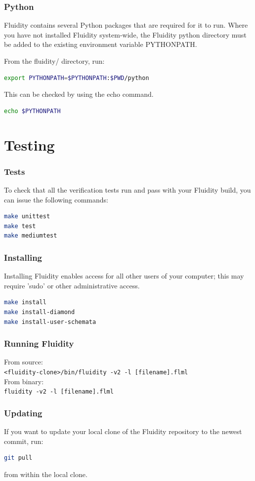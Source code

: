 \documentclass[12pt]{beamer}
\begin{document}
\begin{frame}[fragile]
    \frametitle{Python}
\lstset{language=bash}
Fluidity contains several Python packages that are required for it to run.  
Where you have not installed Fluidity system-wide, the Fluidity python
directory must be added to the existing environment variable PYTHONPATH.

From the fluidity/ directory, run:
\begin{lstlisting}[language=bash,basicstyle=\ttfamily\footnotesize]
export PYTHONPATH=$PYTHONPATH:$PWD/python
\end{lstlisting}
This can be checked by using the echo command.
\begin{lstlisting}[language=bash,basicstyle=\ttfamily\footnotesize]
echo $PYTHONPATH
\end{lstlisting}
\end{frame}

\section{Testing}
\begin{frame}[fragile]
        \frametitle{Tests}
\lstset{language=bash}

To check that all the verification tests run and pass with 
your Fluidity build, you can issue the following commands:

\begin{lstlisting}[language=bash,basicstyle=\ttfamily]
make unittest
make test
make mediumtest
\end{lstlisting}
\end{frame}

\begin{frame}[fragile]
        \frametitle{Installing}
\lstset{language=bash}
Installing Fluidity enables access for all other users of your computer; this
may require 'sudo' or other administrative access.
\begin{lstlisting}[language=bash,basicstyle=\ttfamily]
make install
make install-diamond
make install-user-schemata
\end{lstlisting}
\end{frame}

\begin{frame}
    \frametitle{Running Fluidity}
From source:    
\\ \texttt{<fluidity-clone>/bin/fluidity -v2 -l [filename].flml}
\\ [0.5cm]
From binary:    
\\ \texttt{fluidity -v2 -l [filename].flml}
\end{frame}

\begin{frame}[fragile]
        \frametitle{Updating}
\lstset{language=bash}
If you want to update your local clone of the Fluidity repository to the newest
commit, run:

\begin{lstlisting}[language=bash,basicstyle=\ttfamily]
git pull
\end{lstlisting}

from within the local clone.

\end{frame}
\end{document}
